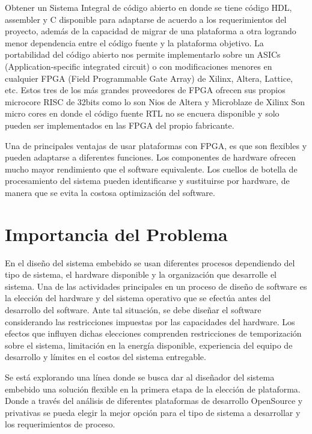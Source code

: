 Obtener un Sistema Integral de código abierto en donde se tiene código HDL, assembler y C disponible para adaptarse de acuerdo a los requerimientos
del proyecto, además de la capacidad de migrar de una plataforma a otra logrando menor dependencia entre el código fuente y la plataforma
objetivo. La portabilidad del código abierto nos permite implementarlo sobre un ASICs (Application-specific integrated circuit) o con modificaciones
menores en cualquier FPGA (Field Programmable Gate Array) de Xilinx, Altera, Lattice, etc. Estos tres de los más grandes proveedores de FPGA  %
ofrecen sus propios microcore RISC de 32bits como lo son Nios de  Altera y Microblaze de Xilinx  Son micro cores en donde el código fuente RTL no se
encuera disponible y solo pueden ser implementados en las FPGA del propio fabricante.

Una de principales ventajas de usar plataformas con FPGA, es que son flexibles y pueden adaptarse a diferentes funciones. Los componentes de
hardware ofrecen mucho mayor rendimiento que el software equivalente. Los cuellos de botella de procesamiento del sistema pueden identificarse y
sustituirse por hardware, de manera que se evita la costosa optimización del software.

\section{Importancia del Problema}

En el diseño del sistema embebido se usan diferentes procesos dependiendo del tipo de sistema, el hardware disponible y la organización que
desarrolle el sistema. Una de las actividades principales en un proceso de diseño de software es la elección del hardware y del sistema operativo que
se efectúa antes del desarrollo del software. Ante tal situación, se debe diseñar el software considerando las restricciones impuestas por las
capacidades del hardware.
Los efectos que influyen dichas elecciones comprenden restricciones de temporización sobre el sistema, limitación en la energía disponible,
experiencia del equipo de desarrollo y límites en el costos del sistema entregable.
 
Se está explorando una línea donde se busca dar al diseñador del sistema embebido una solución flexible en la primera etapa de la elección de
plataforma. Donde a través del análisis de diferentes plataformas de desarrollo OpenSource y privativas se pueda elegir la mejor opción para el tipo
de sistema a desarrollar y los requerimientos de proceso. %
 
